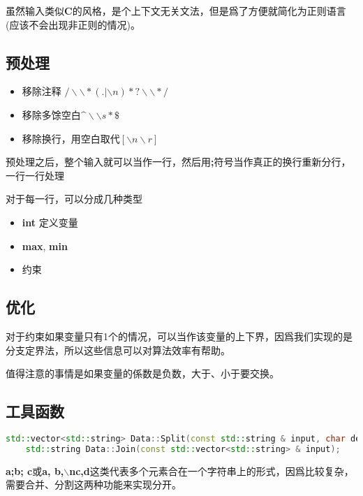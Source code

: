 虽然输入类似\textbf{C}的风格，是个上下文无关文法，但是爲了方便就简化为正则语言(应该不会出现非正则的情况)。

\subsection{预处理}
\begin{itemize}
	\item 移除注释 $/\backslash \backslash *(.|\backslash n)*?\backslash \backslash */$
	\item 移除多馀空白$\^ \backslash \backslash s*\$$
	\item 移除换行，用空白取代$[\backslash n\backslash r]$
\end{itemize}


预处理之后，整个输入就可以当作一行，然后用\textbf{;}符号当作真正的换行重新分行，一行一行处理

对于每一行，可以分成几种类型
\begin{itemize}
    \item \textbf{int} 定义变量
    \item \textbf{max}, \textbf{min}
    \item 约束
\end{itemize}

\subsection{优化}

对于约束如果变量只有1个的情况，可以当作该变量的上下界，因爲我们实现的是分支定界法，所以这些信息可以对算法效率有帮助。

值得注意的事情是如果变量的係数是负数，大于、小于要交换。

\subsection{工具函数}

\begin{lstlisting}[language=C++]
    std::vector<std::string> Data::Split(const std::string & input, char delim);
    std::string Data::Join(const std::vector<std::string> & input);
\end{lstlisting}

\textbf{a;b; c}或\textbf{a, b,$\backslash$nc,d}这类代表多个元素合在一个字符串上的形式，因爲比较复杂，需要合并、分割这两种功能来实现分开。